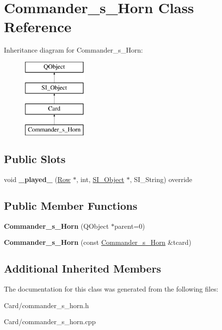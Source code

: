 \hypertarget{class_commander__s___horn}{}\section{Commander\+\_\+s\+\_\+\+Horn Class Reference}
\label{class_commander__s___horn}
Inheritance diagram for Commander\+\_\+s\+\_\+\+Horn\+:\begin{figure}[H]
\begin{center}
\leavevmode
\includegraphics[height=4.000000cm]{class_commander__s___horn}
\end{center}
\end{figure}
\subsection*{Public Slots}
\begin{DoxyCompactItemize}
\item 
\mbox{\label{class_commander__s___horn_a37951a391c2530bbb39916de842d56cd}} 
void {\bfseries \+\_\+played\+\_\+} (\hyperlink{class_card_set}{Row} $\ast$, int, \hyperlink{class_s_i___object}{S\+I\+\_\+\+Object} $\ast$, S\+I\+\_\+\+String) override
\end{DoxyCompactItemize}
\subsection*{Public Member Functions}
\begin{DoxyCompactItemize}
\item 
\mbox{\label{class_commander__s___horn_a9281cf6ef893ff12be0e1d4bf0c04f00}} 
{\bfseries Commander\+\_\+s\+\_\+\+Horn} (Q\+Object $\ast$parent=0)
\item 
\mbox{\label{class_commander__s___horn_a611e65bfcc4393e440f3145ecd0c4ec5}} 
{\bfseries Commander\+\_\+s\+\_\+\+Horn} (const \hyperlink{class_commander__s___horn}{Commander\+\_\+s\+\_\+\+Horn} \&tcard)
\end{DoxyCompactItemize}
\subsection*{Additional Inherited Members}


The documentation for this class was generated from the following files\+:\begin{DoxyCompactItemize}
\item 
Card/commander\+\_\+s\+\_\+horn.\+h\item 
Card/commander\+\_\+s\+\_\+horn.\+cpp\end{DoxyCompactItemize}

